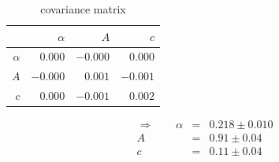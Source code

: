 \begin{table}
    \centering
    \caption{covariance matrix}
 \begin{tabular}{|r|r|r|r|}
 \hline 
\cellcolor[RGB]{204,204,255}&\cellcolor[RGB]{204,204,255}$\alpha$&\cellcolor[RGB]{204,204,240}$A$&\cellcolor[RGB]{204,204,225}$c$\\ \hline 
 \cellcolor[RGB]{204,204,255}$\alpha$&$0.000$ &$-0.000$ &$0.000$ \\ \hline
\cellcolor[RGB]{204,204,240}$A$&$-0.000$ &$0.001$ &$-0.001$ \\ \hline
\cellcolor[RGB]{204,204,225}$c$&$0.000$ &$-0.001$ &$0.002$ \\ \hline
\end{tabular}
\begin{align}
    \Rightarrow \qquad
    \alpha &=& 0.218 \pm 0.010 \\
    A &=& 0.91 \pm 0.04 \\
    c &=& 0.11 \pm 0.04 
\end{align}
\end{table}

